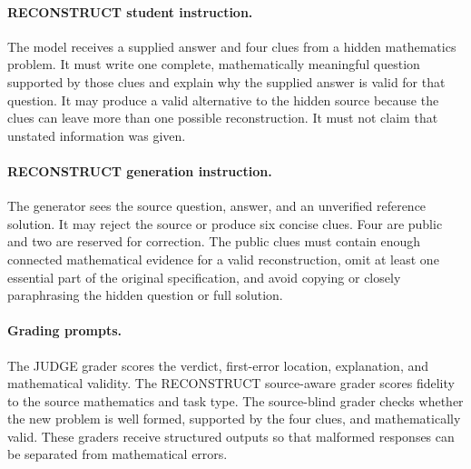 \documentclass[11pt]{article}
\begin{document}
\paragraph{RECONSTRUCT student instruction.}
The model receives a supplied answer and four clues from a hidden mathematics problem. It must write one complete, mathematically meaningful question supported by those clues and explain why the supplied answer is valid for that question. It may produce a valid alternative to the hidden source because the clues can leave more than one possible reconstruction. It must not claim that unstated information was given.

\paragraph{RECONSTRUCT generation instruction.}
The generator sees the source question, answer, and an unverified reference solution. It may reject the source or produce six concise clues. Four are public and two are reserved for correction. The public clues must contain enough connected mathematical evidence for a valid reconstruction, omit at least one essential part of the original specification, and avoid copying or closely paraphrasing the hidden question or full solution.

\paragraph{Grading prompts.}
The JUDGE grader scores the verdict, first-error location, explanation, and mathematical validity. The RECONSTRUCT source-aware grader scores fidelity to the source mathematics and task type. The source-blind grader checks whether the new problem is well formed, supported by the four clues, and mathematically valid. These graders receive structured outputs so that malformed responses can be separated from mathematical errors.
\end{document}
